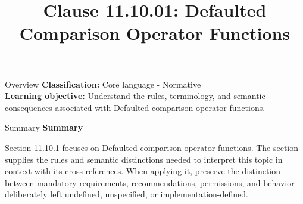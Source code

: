 \documentclass[10pt,letterpaper]{article}
\title{Clause 11.10.01: Defaulted Comparison Operator Functions}
\author{}
\date{}
\begin{document}
\maketitle
\begin{CornellOverviewBox}{Overview}
\textbf{Classification:} Core language - Normative\\[2pt]
\textbf{Learning objective:} Understand the rules, terminology, and semantic consequences associated with Defaulted comparison operator functions.
\end{CornellOverviewBox}\begin{CornellSummaryBox}{Summary}
{\sffamily\bfseries\color{Accent} Summary}\par\vspace{3pt}Section 11.10.1 focuses on Defaulted comparison operator functions. The section supplies the rules and semantic distinctions needed to interpret this topic in context with its cross-references. When applying it, preserve the distinction between mandatory requirements, recommendations, permissions, and behavior deliberately left undefined, unspecified, or implementation-defined.
\end{CornellSummaryBox}
\end{document}
